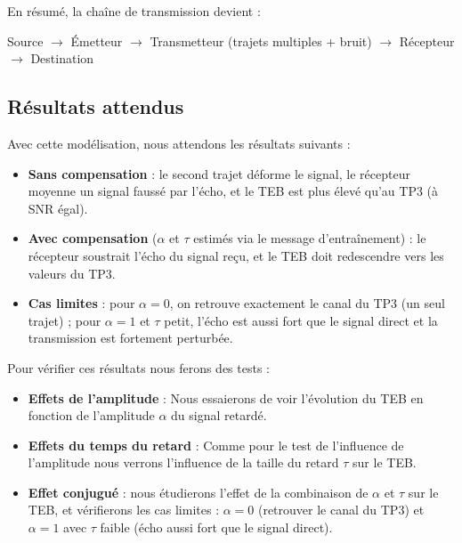 \documentclass[a4paper,12pt]{report}
\begin{document}
En résumé, la chaîne de transmission devient :

\begin{center}
Source $\rightarrow$ Émetteur $\rightarrow$ Transmetteur (trajets
multiples + bruit) $\rightarrow$ Récepteur $\rightarrow$ Destination
\end{center}

\subsection{Résultats attendus}

Avec cette modélisation, nous attendons les résultats suivants :

\begin{itemize}
    \item \textbf{Sans compensation} : le second trajet déforme le
          signal, le récepteur moyenne un signal faussé par l'écho,
          et le TEB est plus élevé qu'au TP3 (à SNR égal).
    \item \textbf{Avec compensation} ($\alpha$ et $\tau$ estimés via
          le message d'entraînement) : le récepteur soustrait l'écho
          du signal reçu, et le TEB doit redescendre vers les valeurs
          du TP3.
    \item \textbf{Cas limites} : pour $\alpha = 0$, on retrouve
          exactement le canal du TP3 (un seul trajet) ; pour
          $\alpha = 1$ et $\tau$ petit, l'écho est aussi fort que le
          signal direct et la transmission est fortement perturbée.
\end{itemize}

Pour vérifier ces résultats nous ferons des tests :

\begin{itemize}
    \item \textbf{Effets de l'amplitude} : Nous essaierons de voir l'évolution du TEB en fonction de l'amplitude $\alpha$  du signal retardé.
    \item \textbf{Effets du temps du retard} : Comme pour le test de l'influence de l'amplitude nous verrons l'influence de la taille du retard $\tau$ sur le TEB. 
    \item \textbf{Effet conjugué} : nous étudierons l'effet de la
      combinaison de $\alpha$ et $\tau$ sur le TEB, et vérifierons
      les cas limites : $\alpha = 0$ (retrouver le canal du TP3) et
      $\alpha = 1$ avec $\tau$ faible (écho aussi fort que le
      signal direct).
\end{itemize}
\end{document}
